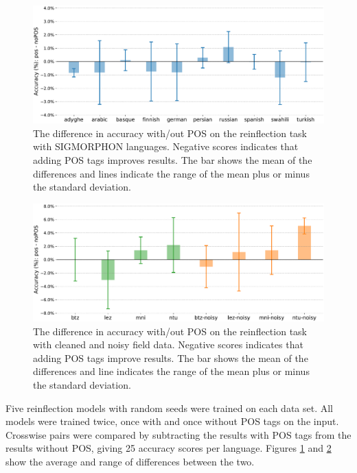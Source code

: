 \begin{figure}[htb]
    \centering
    \includegraphics[width=34em]{figs/pos_2018data.pdf}
    \caption[SIGMORPHON Reinflection with/out POS Tags]{The difference in accuracy with/out POS on the reinflection task with SIGMORPHON languages. Negative scores indicates that adding POS tags improves results. The bar shows the mean of the differences and lines indicate the range of the mean plus or minus the standard deviation.}
    \label{fig:sigreinfl}
\end{figure}

\begin{figure}[ht]
    \centering
    \includegraphics[width=41em]{figs/pos_igtdata.pdf}
    \caption[IGT Reinflection with/out POS Tags]{The difference in accuracy with/out POS on the reinflection task with cleaned and noisy field data. Negative scores indicates that adding POS tags improve results. The bar shows the mean of the differences and line indicates the range of the mean plus or minus the standard deviation.}
    \label{fig:igtreinfl}
\end{figure}


Five reinflection models with random seeds were trained on each data set. All models were trained twice, once with and once without POS tags on the input. Crosswise pairs were compared by subtracting the results with POS tags from the results without POS, giving 25 accuracy scores per language. Figures \ref{fig:sigreinfl} and \ref{fig:igtreinfl} show the average and range of differences between the two.  

